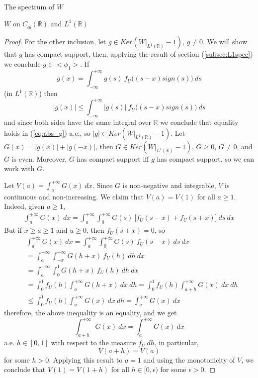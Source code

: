 \documentclass[12pt]{article}
\begin{document}
\begin{section}{The spectrum of $W$ }
\begin{subsection}{$W$ on $C_{_{0\!0}}(\mathbb{R})$ and $L^1(\mathbb{R})$}
\begin{proof}
For the other inclusion, let $g \in Ker\left( W\Big|_{L^1(\mathbb{R})} - 1 \right) $, $g \ne 0$. We will show that $g$ has compact support, then, applying the result of section (\ref{subsec:L1spec}) we conclude $g \in <\phi_1>$. If
\begin{equation} \label{eq:1eigen_g}
g(x) = \int_{-\infty}^{+\infty} g(s) \ f_U\!\Big( (s-x)sign(s) \Big) \ ds
\end{equation}
(in $L^1(\mathbb{R})$) then
\begin{equation} \label{eq:abs_g}
|g(x)| \le \int_{-\infty}^{+\infty} |g(s)| \ f_U\!\Big( (s-x)sign(s) \Big) \ ds
\end{equation}
and since both sides have the same integral over $\mathbb{R}$ we conclude that equality holds in (\ref{eq:abs_g}) a.e., so $|g| \in Ker\left( W\Big|_{L^1(\mathbb{R})} - 1 \right) $. Let $G(x) = |g(x)| + |g(-x)|$, then $G \in Ker\left( W\Big|_{L^1(\mathbb{R})} - 1 \right) $, $G \ge 0$, $G \ne 0$, and $G$ is even. Moreover, $G$ has compact support iff $g$ has compact support, so we can work with $G$. 

Let $V(a) = \int_{a}^{+\infty} G(x) \ dx$. Since $G$ is non-negative and integrable, $V$ is continuous and non-increasing. We claim that $V(a) = V(1)$ for all $a \ge 1$. Indeed, given $a \ge 1$,
\begin{align*}
\int_{a}^{+\infty} G(x) \ dx = 
\int_{a}^{+\infty} \int_{0}^{+\infty} G(s) \ \Big[ f_U(s-x) + f_U(s+x) \Big] \ ds \ dx
\end{align*}
But if $x \ge a \ge 1$ and $u \ge 0$, then $f_U(s+x) = 0$, so
\begin{align*}
&\int_{a}^{+\infty} G(x) \ dx = 
\int_{a}^{+\infty} \int_{0}^{+\infty} G(s) \  f_U(s-x)  \ ds \ dx \\
&=\int_{a}^{+\infty} \int_{-x}^{+\infty}  G(h+x) \ f_U(h)  \ dh \ dx \\
&=\int_{a}^{+\infty} \int_{0}^{1}  G(h+x) \ f_U(h)  \ dh \ dx \\
&=\int_{0}^{1} f_U(h) \int_{a}^{+\infty}  G(h+x) \ dx \ dh =
\int_{0}^{1} f_U(h) \int_{a+h}^{+\infty}  G(x) \ dx \ dh \\
& \le \int_{0}^{1} f_U(h) \int_{a}^{+\infty}  G(x) \ dx \ dh = \int_{a}^{+\infty}  G(x) \ dx
\end{align*}
therefore, the above inequality is an equality, and we get
$$
\int_{a+h}^{+\infty}  G(x) \ dx =  \int_{a}^{+\infty}  G(x) \ dx 
$$
a.e. $h \in [0,1]$ with respect to the measure $f_U \ dh$, in particular,
$$
V(a+h) = V(a) 
$$
for some $h > 0$. Applying this result to $a=1$ and using the monotonicity of $V$, we conclude that $V(1)=V(1+h)$ for all $h \in [0,\epsilon)$ for some $\epsilon > 0$.  


\end{proof}
\end{subsection}
\end{section}
\end{document}
